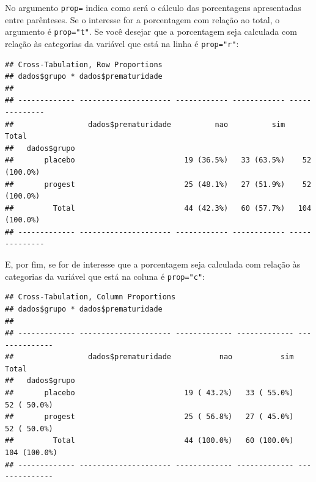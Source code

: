 \documentclass[
]{book}
\newenvironment{Shaded}{\begin{snugshade}}{\end{snugshade}}
\newcommand{\DataTypeTok}[1]{\textcolor[rgb]{0.13,0.29,0.53}{#1}}
\newcommand{\KeywordTok}[1]{\textcolor[rgb]{0.13,0.29,0.53}{\textbf{#1}}}
\newcommand{\NormalTok}[1]{#1}
\newcommand{\OperatorTok}[1]{\textcolor[rgb]{0.81,0.36,0.00}{\textbf{#1}}}
\newcommand{\StringTok}[1]{\textcolor[rgb]{0.31,0.60,0.02}{#1}}
\begin{document}
No argumento \texttt{prop=} indica como será o cálculo das porcentagens apresentadas entre parênteses. Se o interesse for a porcentagem com relação ao total, o argumento é \texttt{prop="t"}. Se você desejar que a porcentagem seja calculada com relação às categorias da variável que está na linha é \texttt{prop="r"}:

\begin{Shaded}
\end{Shaded}

\begin{verbatim}
## Cross-Tabulation, Row Proportions  
## dados$grupo * dados$prematuridade  
## 
## ------------- --------------------- ------------ ------------ --------------
##                 dados$prematuridade          nao          sim          Total
##   dados$grupo                                                               
##       placebo                         19 (36.5%)   33 (63.5%)    52 (100.0%)
##       progest                         25 (48.1%)   27 (51.9%)    52 (100.0%)
##         Total                         44 (42.3%)   60 (57.7%)   104 (100.0%)
## ------------- --------------------- ------------ ------------ --------------
\end{verbatim}

E, por fim, se for de interesse que a porcentagem seja calculada com relação às categorias da variável que está na coluna é \texttt{prop="c"}:

\begin{Shaded}
\end{Shaded}

\begin{verbatim}
## Cross-Tabulation, Column Proportions  
## dados$grupo * dados$prematuridade  
## 
## ------------- --------------------- ------------- ------------- --------------
##                 dados$prematuridade           nao           sim          Total
##   dados$grupo                                                                 
##       placebo                         19 ( 43.2%)   33 ( 55.0%)    52 ( 50.0%)
##       progest                         25 ( 56.8%)   27 ( 45.0%)    52 ( 50.0%)
##         Total                         44 (100.0%)   60 (100.0%)   104 (100.0%)
## ------------- --------------------- ------------- ------------- --------------
\end{verbatim}
\end{document}
